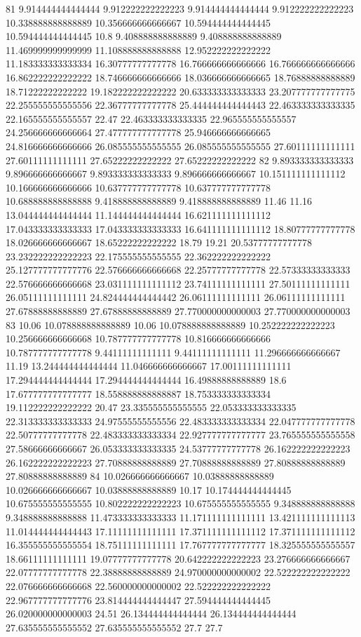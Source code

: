 81 9.914444444444444 9.912222222222223 9.914444444444444 9.912222222222223 10.338888888888889 10.356666666666667 10.594444444444445 10.594444444444445 10.8 9.408888888888889 9.408888888888889 11.469999999999999 11.108888888888888 12.952222222222222 11.183333333333334 16.30777777777778 16.766666666666666 16.766666666666666 16.862222222222222 18.746666666666666 18.036666666666665 18.76888888888889 18.71222222222222 19.182222222222222 20.633333333333333 23.207777777777775 22.255555555555556 22.36777777777778 25.444444444444443 22.463333333333335 22.165555555555557 22.47 22.463333333333335 22.965555555555557 24.256666666666664 27.477777777777778 25.946666666666665 24.816666666666666 26.085555555555555 26.085555555555555 27.60111111111111 27.60111111111111 27.65222222222222 27.65222222222222
82 9.893333333333333 9.896666666666667 9.893333333333333 9.896666666666667 10.151111111111112 10.166666666666666 10.637777777777778 10.637777777777778 10.688888888888888 9.418888888888889 9.418888888888889 11.46 11.16 13.044444444444444 11.144444444444444 16.621111111111112 17.043333333333333 17.043333333333333 16.641111111111112 18.80777777777778 18.026666666666667 18.65222222222222 18.79 19.21 20.53777777777778 23.232222222222223 22.175555555555555 22.362222222222222 25.127777777777776 22.576666666666668 22.25777777777778 22.57333333333333 22.576666666666668 23.031111111111112 23.74111111111111 27.50111111111111 26.05111111111111 24.824444444444442 26.06111111111111 26.06111111111111 27.67888888888889 27.67888888888889 27.770000000000003 27.770000000000003
83 10.06 10.078888888888889 10.06 10.078888888888889 10.252222222222223 10.256666666666668 10.787777777777778 10.816666666666666 10.787777777777778 9.44111111111111 9.44111111111111 11.296666666666667 11.19 13.244444444444444 11.046666666666667 17.00111111111111 17.294444444444444 17.294444444444444 16.49888888888889 18.6 17.677777777777777 18.558888888888887 18.753333333333334 19.112222222222222 20.47 23.335555555555555 22.053333333333335 22.313333333333333 24.97555555555556 22.483333333333334 22.047777777777778 22.50777777777778 22.483333333333334 22.927777777777777 23.765555555555558 27.58666666666667 26.053333333333335 24.53777777777778 26.162222222222223 26.162222222222223 27.70888888888889 27.70888888888889 27.80888888888889 27.80888888888889
84 10.026666666666667 10.03888888888889 10.026666666666667 10.03888888888889 10.17 10.174444444444445 10.675555555555555 10.802222222222223 10.675555555555555 9.348888888888888 9.348888888888888 11.473333333333333 11.171111111111111 13.421111111111113 11.014444444444443 17.11111111111111 17.371111111111112 17.371111111111112 16.355555555555554 18.75111111111111 17.767777777777777 18.325555555555557 18.66111111111111 19.07777777777778 20.642222222222223 23.276666666666667 22.07777777777778 22.38888888888889 24.970000000000002 22.522222222222222 22.076666666666668 22.560000000000002 22.522222222222222 22.967777777777776 23.814444444444447 27.594444444444445 26.020000000000003 24.51 26.134444444444444 26.134444444444444 27.635555555555552 27.635555555555552 27.7 27.7

